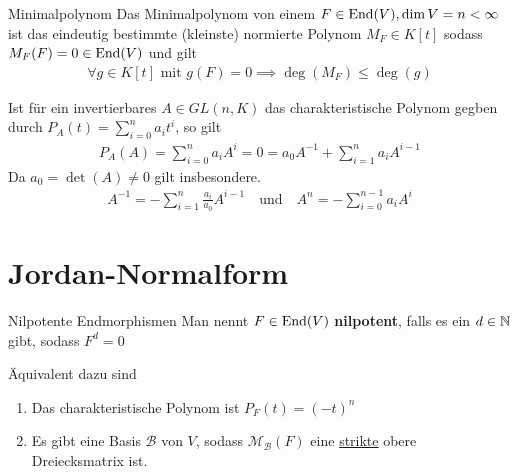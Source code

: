 \begin{definition}{Minimalpolynom}
    Das Minimalpolynom von einem $F \in \operatorname{End}(V), \dim V = n < \infty$ ist das eindeutig bestimmte (kleinste) normierte Polynom $M_F \in K[t]$ sodass $M_F(F) = 0 \in \operatorname{End}(V)$ und gilt
    \begin{align*}
        \forall g \in K[t] \text{ mit } g(F) = 0 \implies \deg(M_F) \leq \deg(g)
    \end{align*}
\end{definition}
Ist für ein invertierbares $A \in GL(n,K)$ das charakteristische Polynom gegben durch $P_A(t) = \sum_{i = 0}^{n}a_i t^i$, so gilt
\begin{align*}
    P_A(A) = \sum_{i = 0}^{n}a_i A^{i} = 0 =  a_0 A^{-1} + \sum_{i = 1}^{n} a_i A^{i-1}
\end{align*}
Da $a_0 = \det(A) \neq 0$ gilt insbesondere.
\begin{align*}
    A^{-1} = - \sum_{i = 1}^{n} \frac{a_i}{a_0}A^{i-1} \quad \text{und} \quad  A^n = -\sum_{i = 0}^{n-1} a_i A^i
\end{align*}


\section{Jordan-Normalform}

\begin{definition}{Nilpotente Endmorphismen}
    Man nennt $F \in \operatorname{End}(V)$ \textbf{nilpotent}, falls es ein $d \in \mathbb{N}$ gibt, sodass $F^d = 0$
\end{definition}
Äquivalent dazu sind
\begin{enumerate}
    \item	Das charakteristische Polynom ist $P_F(t) = (-t)^n$
    \item   Es gibt eine Basis $\mathcal{B}$ von $V$, sodass $\mathcal{M}_{\mathcal{B}}(F)$ eine \underline{strikte} obere Dreiecksmatrix ist.
\end{enumerate}

